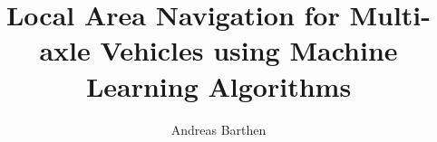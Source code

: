 \documentclass[bsc,en,
oneside,12pt,utf8,a4paper,
]{thesisdifctunl}
\title{Local Area Navigation for Multi-axle Vehicles using Machine Learning Algorithms}
\author[m]{Andreas Barthen}
\begin{document}
\frontmatter

\frontpage



\printacknowledgements


\printabstract

\tableofcontents 

\printotherlists 

\printchapthers


\printappendixes 
\end{document}
